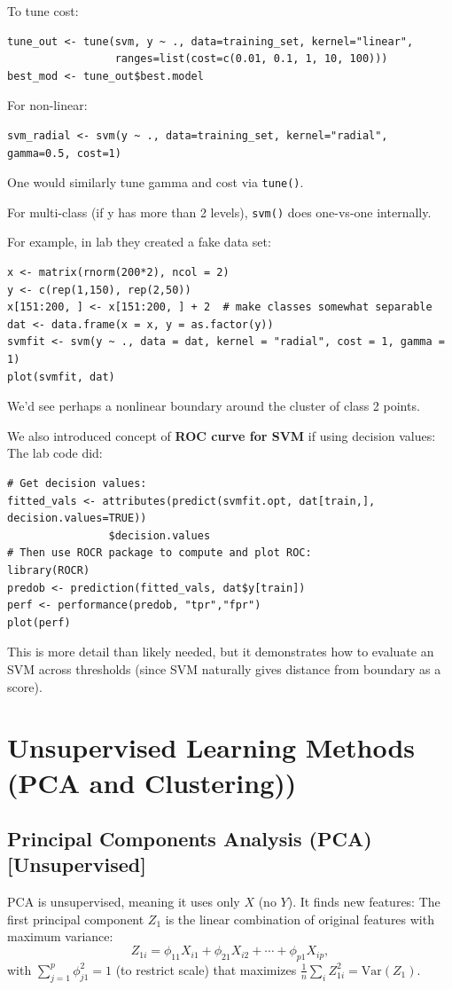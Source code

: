 \documentclass[11pt]{article}
\begin{document}
To tune cost:
\begin{verbatim}
tune_out <- tune(svm, y ~ ., data=training_set, kernel="linear",
                 ranges=list(cost=c(0.01, 0.1, 1, 10, 100)))
best_mod <- tune_out$best.model
\end{verbatim}
For non-linear:
\begin{verbatim}
svm_radial <- svm(y ~ ., data=training_set, kernel="radial", gamma=0.5, cost=1)
\end{verbatim}
One would similarly tune gamma and cost via \texttt{tune()}.

For multi-class (if y has more than 2 levels), \texttt{svm()} does one-vs-one internally.

For example, in lab they created a fake data set:
\begin{verbatim}
x <- matrix(rnorm(200*2), ncol = 2)
y <- c(rep(1,150), rep(2,50))
x[151:200, ] <- x[151:200, ] + 2  # make classes somewhat separable
dat <- data.frame(x = x, y = as.factor(y))
svmfit <- svm(y ~ ., data = dat, kernel = "radial", cost = 1, gamma = 1)
plot(svmfit, dat)
\end{verbatim}
We'd see perhaps a nonlinear boundary around the cluster of class 2 points.

We also introduced concept of \textbf{ROC curve for SVM} if using decision values:
The lab code did:
\begin{verbatim}
# Get decision values:
fitted_vals <- attributes(predict(svmfit.opt, dat[train,], decision.values=TRUE))
                $decision.values
# Then use ROCR package to compute and plot ROC:
library(ROCR)
predob <- prediction(fitted_vals, dat$y[train])
perf <- performance(predob, "tpr","fpr")
plot(perf)
\end{verbatim}
This is more detail than likely needed, but it demonstrates how to evaluate an SVM across thresholds (since SVM naturally gives distance from boundary as a score).

\section{Unsupervised Learning Methods (PCA and Clustering))}

\subsection{Principal Components Analysis (PCA) [Unsupervised]}
PCA is unsupervised, meaning it uses only $X$ (no $Y$). It finds new features:
The first principal component $Z_1$ is the linear combination of original features with maximum variance:
\[ Z_{1i} = \phi_{11} X_{i1} + \phi_{21}X_{i2} + \cdots + \phi_{p1}X_{ip}, \]
with $\sum_{j=1}^p \phi_{j1}^2 = 1$ (to restrict scale) that maximizes $\frac{1}{n}\sum_{i} Z_{1i}^2 = \text{Var}(Z_1)$.
\end{document}
